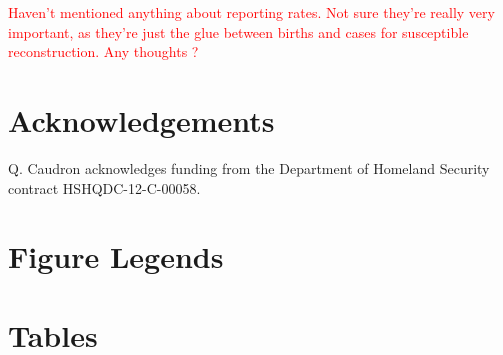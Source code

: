\documentclass[10pt]{article}
\begin{document}
\textcolor{red}{Haven't mentioned anything about reporting rates. Not sure they're really very important, as they're just the glue between births and cases for susceptible reconstruction. Any thoughts ?}












\section*{Acknowledgements}

Q. Caudron acknowledges funding from the Department of Homeland Security contract HSHQDC-12-C-00058.









\section*{Figure Legends}


\section*{Tables}
\end{document}

